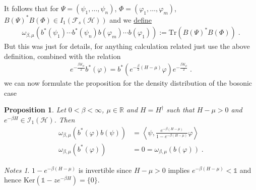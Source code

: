 \documentclass[
a4paper, %
11pt, %
onecolumn, %
openany, %
]{memoir}
\theoremstyle{definition}
\theoremstyle{remark}
\newtheorem{notes}[definition]{Notes}
\theoremstyle{plain}
\newtheorem{prop}[definition]{Proposition}
\begin{document}
It follows that for $\Psi=(\psi_1,\ldots,\psi_n)$, $\Phi=(\varphi_1,\ldots,\varphi_m)$, $B(\Psi)^*B(\Phi)\in I_1(\mathcal{F}_s(\mathcal{H}))$ and we \underline{define}\begin{align}
\omega_{\beta,\mu}(b^*(\psi_1)\cdots b^*(\psi_n)b(\varphi_m)\cdots b(\varphi_1)):=\mathrm{Tr}(B(\Psi)^*B(\Phi))\;.
\end{align}
But this was just for details, for anything calculation related just use the above definition, combined with the relation\begin{align}
e^{-\frac{\beta K_{\mu}}{2}}b^*(\varphi)=b^*(e^{-\frac{\beta }{2}(H-\mu)}\varphi)e^{-\frac{\beta K_{\mu}}{2}}\; .\label{eqn::boson_relation}
\end{align} we can now formulate the proposition for the density distribution of the bosonic case
\begin{prop} Let $0<\beta<\infty$, $\mu\in\mathbb{R}$ and $H=H^{\dagger}$ such that $H-\mu>0$ and $e^{-\beta H}\in \mathcal{I_1(\mathcal{H})}$. Then \begin{align}
\omega_{\beta,\mu}(b^*(\varphi)b(\psi))&=\left\langle\psi, \frac{e^{-\beta(H-\mu)}}{1-e^{-\beta(H-\mu)}}\varphi\right\rangle\\
\omega_{\beta,\mu}(b^*(\varphi))&=0=\omega_{\beta,\mu}(b(\varphi))\; .
\end{align}
\end{prop}
\begin{notes}
	$1-e^{-\beta(H-\mu)}$ is invertible since $H-\mu>0$ implies $e^{-\beta(H-\mu)}<\mathds{1}$ and hence $\mathrm{Ker}(\mathds{1}-ze^{-\beta H})=\{0\}$.
\end{notes}
\end{document}
